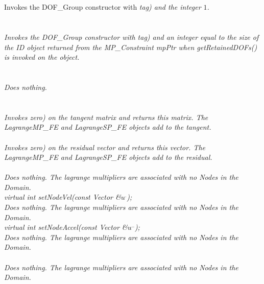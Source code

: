   \\
  \\
Invokes the DOF\_Group constructor with {\em tag) and the integer $1$. \\

  \\ \\
Invokes the DOF\_Group constructor with {\em tag) and an integer equal
to the size of the ID object returned from the MP\_Constraint {\em
mpPtr} when {\em getRetainedDOFs()} is invoked on the object. \\

  \\
  \\
Does nothing. \\

 \\
 \\
Invokes {\em zero{}) on the tangent matrix and returns this matrix. 
The LagrangeMP\_FE and LagrangeSP\_FE objects add to the tangent. \\


\\
Invokes {\em zero{}) on the residual vector and returns this vector. 
The LagrangeMP\_FE and LagrangeSP\_FE objects add to the residual. \\

 \\
Does nothing. The lagrange multipliers are associated with no Nodes
in the Domain. \\


{\em virtual int setNodeVel(const Vector \&$u^{.}$);}\\
Does nothing. The lagrange multipliers are associated with no Nodes
in the Domain. \\

{\em virtual int setNodeAccel(const Vector \&$u^{..}$);}\\
Does nothing. The lagrange multipliers are associated with no Nodes
in the Domain. \\

 \\
Does nothing. The lagrange multipliers are associated with no Nodes
in the Domain. \\

}}}}
